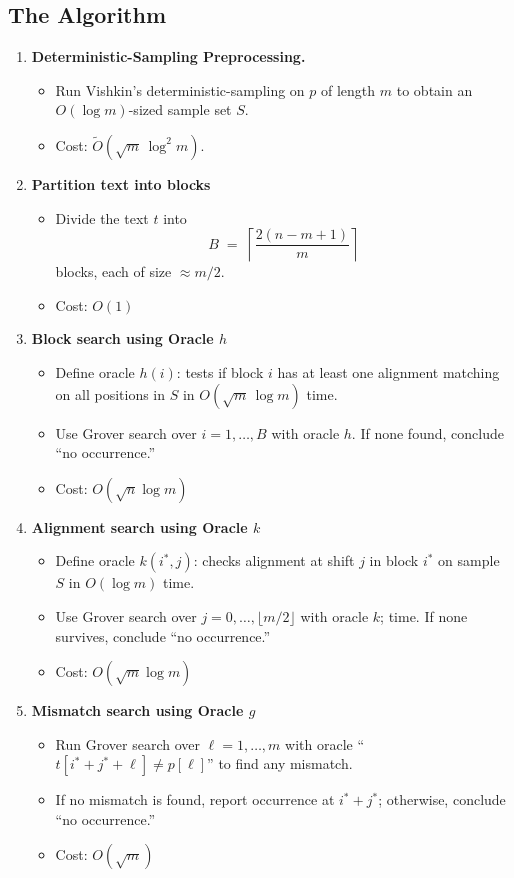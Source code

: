 \documentclass[12pt]{IEEEtran}
\begin{document}
\subsection{The Algorithm}
\begin{enumerate}
    \item \textbf{Deterministic-Sampling Preprocessing.}
          \begin{itemize}
              \item Run Vishkin's deterministic-sampling on \(p\) of length \(m\) to obtain an \(O(\log m)\)-sized sample set \(S\).
              \item Cost: \(\widetilde O(\sqrt{m}\,\log^2 m)\).
          \end{itemize}
    \item \textbf{Partition text into blocks}
          \begin{itemize}
              \item Divide the text \(t\) into
                    \[
                        B \;=\; \left\lceil \frac{2(n - m + 1)}{m} \right\rceil
                    \]
                    blocks, each of size \(\approx m/2\).
              \item Cost: \(O(1)\)
          \end{itemize}
    \item \textbf{Block search using Oracle \(h\)}
          \begin{itemize}
              \item Define oracle \(h(i)\): tests if block \(i\) has at least one alignment matching on all positions in \(S\) in \(O(\sqrt{m}\,\log m)\) time.
              \item Use Grover search over \(i=1,\dots,B\) with oracle \(h\). If none found, conclude ``no occurrence.''
              \item Cost: \(O(\sqrt{n} \log m)\)
          \end{itemize}
    \item \textbf{Alignment search using Oracle \(k\)}
          \begin{itemize}
              \item Define oracle \(k(i^*,j)\): checks alignment at shift \(j\) in block \(i^*\) on sample \(S\) in \(O(\log m)\) time.
              \item Use Grover search over \(j=0,\dots,\lfloor m/2\rfloor\) with oracle \(k\); time. If none survives, conclude ``no occurrence.''
              \item Cost: \(O(\sqrt{m} \log m)\)
          \end{itemize}
    \item \textbf{Mismatch search using Oracle \(g\)}
          \begin{itemize}
              \item Run Grover search over \(\ell=1,\dots,m\) with oracle ``\(t[i^*+j^*+\ell]\neq p[\ell]\)'' to find any mismatch.
              \item If no mismatch is found, report occurrence at \(i^*+j^*\); otherwise, conclude ``no occurrence.''
              \item Cost: \(O(\sqrt{m})\)
          \end{itemize}
\end{enumerate}
\end{document}
